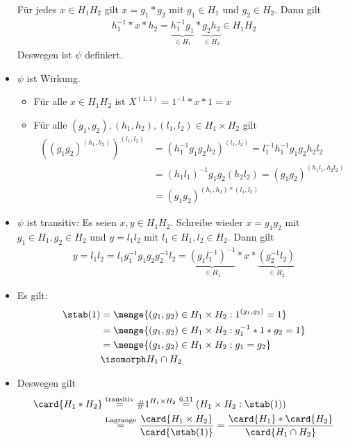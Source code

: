 \begin{uebungsblatt}
\begin{loesung}
\begin{itemize}
		Für jedes $x \in H_1 H_2$ gilt $x = g_1*g_2$ mit $g_1 \in H_1$ und $g_2 \in H_2$. Dann gilt
		\begin{align*}
			h_1^{-1} * x * h_2 = \underbrace{h_1^{-1} g_1}_{\in H_1} * \underbrace{g_2 h_2}_{\in H_2} \in H_1 H_2
		\end{align*}
		Deswegen ist $\psi$ definiert.
		\item $\psi$ ist Wirkung.
		\begin{itemize}
			\item Für alle $x \in H_1 H_2$ ist $X^{(1,1)} = 1^{-1} * x * 1 = x$
			\item Für alle $(g_1, g_2), (h_1, h_2), (l_1, l_2) \in H_1 \times H_2$ gilt
			\begin{align*}
				((g_1 g_2)^{(h_1, h_2)})^{(l_1, l_2)} 
				&= (h_1^{-1} g_1 g_2 h_2)^{(l_1, l_2)} 
				= l_1^{-1} h_1^{-1} g_1 g_2 h_2 l_2 \\
				&= (h_1 l_1)^{-1} g_1 g_2 (h_2 l_2) = (g_1 g_2)^{(h_1 l_1 , h_2 l_2)} \\
				&= (g_1 g_2)^{(h_1,h_2)*(l_1,l_2)}
			\end{align*}
		\end{itemize}
	\item $\psi$ ist transitiv: Es seien $x,y \in H_1 H_2$. Schreibe wieder $x = g_1 g_2$ mit $g_1 \in H_1, g_2 \in H_2$ und $y = l_1 l_2$ mit $l_1 \in H_1, l_2 \in H_2$. Dann gilt
	\begin{align*}
		y = l_1 l_2 = l_1 g_1^{-1} g_1 g_2 g_2^{-1} l_2 = \underbrace{(g_1 l_1^{-1})^{-1}}_{\in H_1} * x * \underbrace{(g_2^{-1} l_2)}_{\in H_2}
	\end{align*}
	\item Es gilt: 
	\begin{align*}
		\stab(1) &= \menge{(g_1, g_2) \in H_1 \times H_2 : 1^{(g_1,g_2)} = 1} \\
		&= \menge{(g_1, g_2) \in H_1 \times H_2 : g_1^{-1} * 1 * g_2 = 1} \\
		&= \menge{(g_1, g_2) \in H_1 \times H_2 : g_1 = g_2} \\
		&\isomorph H_1 \cap H_2
	\end{align*}
	\item Deswegen gilt 
	\begin{align*}
		\card{H_1 * H_2} &\overset{\text{{\scriptsize transitiv}}}{=} \# 1^{H_1 \times H_2} \overset{6.11}{=} (H_1 \times H_2 : \stab(1)) \\
		&\overset{\text{\scriptsize Lagrange}}{=} \frac{\card{H_1 \times H_2}}{\card{\stab(1)}} = \frac{\card{H_1}*\card{H_2}}{\card{H_1 \cap H_2}}

\end{align*}
\end{itemize}
\end{loesung}
\end{uebungsblatt}
